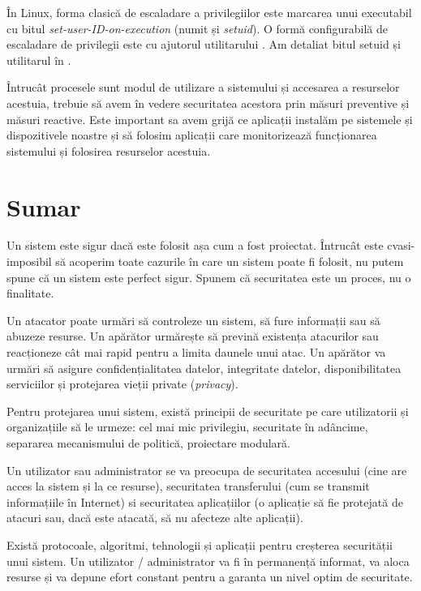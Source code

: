 În Linux, forma clasică de escaladare a privilegiilor este marcarea unui executabil cu bitul \textit{set-user-ID-on-execution} (numit și \textit{setuid}).
O formă configurabilă de escaladare de privilegii este cu ajutorul utilitarului .
Am detaliat bitul setuid și utilitarul  în .

Întrucât procesele sunt modul de utilizare a sistemului și accesarea a resurselor acestuia, trebuie să avem în vedere securitatea acestora prin măsuri preventive și măsuri reactive.
Este important sa avem grijă ce aplicații instalăm pe sistemele și dispozitivele noastre și să folosim aplicații care monitorizează funcționarea sistemului și folosirea resurselor acestuia.

\section{Sumar}
\label{sec:sec:summary}

Un sistem este sigur dacă este folosit așa cum a fost proiectat.
Întrucât este cvasi-imposibil să acoperim toate cazurile în care un sistem poate fi folosit, nu putem spune că un sistem este perfect sigur.
Spunem că securitatea este un proces, nu o finalitate.

Un atacator poate urmări să controleze un sistem, să fure informații sau să abuzeze resurse.
Un apărător urmărește să prevină existența atacurilor sau reacționeze cât mai rapid pentru a limita daunele unui atac.
Un apărător va urmări să asigure confidențialitatea datelor, integritate datelor, disponibilitatea serviciilor și protejarea vieții private (\textit{privacy}).

Pentru protejarea unui sistem, există principii de securitate pe care utilizatorii și organizațiile să le urmeze: cel mai mic privilegiu, securitate în adâncime, separarea mecanismului de politică, proiectare modulară.

Un utilizator sau administrator se va preocupa de securitatea accesului (cine are acces la sistem și la ce resurse), securitatea transferului (cum se transmit informațiile în Internet) si securitatea aplicațiilor (o aplicație să fie protejată de atacuri sau, dacă este atacată, să nu afecteze alte aplicații).

Există protocoale, algoritmi, tehnologii și aplicații pentru creșterea securității unui sistem.
Un utilizator / administrator va fi în permanență informat, va aloca resurse și va depune efort constant pentru a garanta un nivel optim de securitate.

